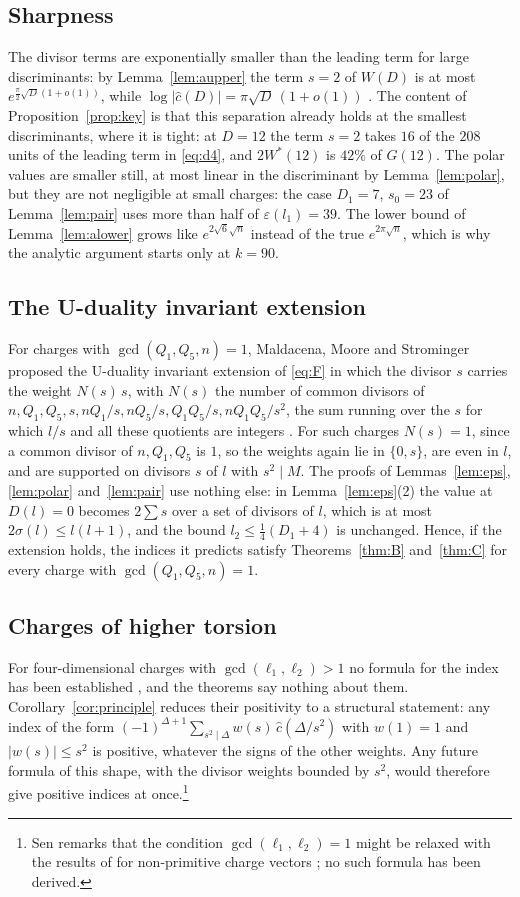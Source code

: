 \documentclass[11pt]{amsart}
\theoremstyle{definition}
\newcommand{\cc}{\hat c}
\newcommand{\Kzero}{90}
\begin{document}
\subsection{Sharpness}
The divisor terms are exponentially smaller than the leading term for large discriminants: by Lemma~\ref{lem:aupper} the term $s=2$ of $W(D)$ is at most $e^{\frac\pi2\sqrt{D}(1+o(1))}$, while $\log|\cc(D)|=\pi\sqrt D\,(1+o(1))$ \cite[(2.7)]{Sen10}. The content of Proposition~\ref{prop:key} is that this separation already holds at the smallest discriminants, where it is tight: at $D=12$ the term $s=2$ takes $16$ of the $208$ units of the leading term in \eqref{eq:d4}, and $2W^*(12)$ is $42\%$ of $G(12)$. The polar values are smaller still, at most linear in the discriminant by Lemma~\ref{lem:polar}, but they are not negligible at small charges: the case $D_1=7$, $s_0=23$ of Lemma~\ref{lem:pair} uses more than half of $\varepsilon(l_1)=39$. The lower bound of Lemma~\ref{lem:alower} grows like $e^{2\sqrt6\sqrt n}$ instead of the true $e^{2\pi\sqrt n}$, which is why the analytic argument starts only at $k=\Kzero$.

\subsection{The U-duality invariant extension}
For charges with $\gcd(Q_1,Q_5,n)=1$, Maldacena, Moore and Strominger proposed the U-duality invariant extension of \eqref{eq:F} in which the divisor $s$ carries the weight $N(s)\,s$, with $N(s)$ the number of common divisors of $n,Q_1,Q_5,s,nQ_1/s,nQ_5/s,Q_1Q_5/s,nQ_1Q_5/s^2$, the sum running over the $s$ for which $l/s$ and all these quotients are integers \cite[(6.2)--(6.3)]{MMS99}. For such charges $N(s)=1$, since a common divisor of $n,Q_1,Q_5$ is $1$, so the weights again lie in $\{0,s\}$, are even in $l$, and are supported on divisors $s$ of $l$ with $s^2\mid M$. The proofs of Lemmas~\ref{lem:eps}, \ref{lem:polar} and~\ref{lem:pair} use nothing else: in Lemma~\ref{lem:eps}(2) the value at $D(l)=0$ becomes $2\sum s$ over a set of divisors of $l$, which is at most $2\sigma(l)\le l(l+1)$, and the bound $l_2\le\frac14(D_1+4)$ is unchanged. Hence, if the extension holds, the indices it predicts satisfy Theorems~\ref{thm:B} and~\ref{thm:C} for every charge with $\gcd(Q_1,Q_5,n)=1$.

\subsection{Charges of higher torsion}\label{ssec:torsion}
For four-dimensional charges with $\gcd(\ell_1,\ell_2)>1$ no formula for the index has been established \cite[\S2]{Sen10}, and the theorems say nothing about them. Corollary~\ref{cor:principle} reduces their positivity to a structural statement: any index of the form $(-1)^{\Delta+1}\sum_{s^2\mid\Delta}w(s)\,\cc(\Delta/s^2)$ with $w(1)=1$ and $|w(s)|\le s^2$ is positive, whatever the signs of the other weights. Any future formula of this shape, with the divisor weights bounded by $s^2$, would therefore give positive indices at once.\footnote{Sen remarks that the condition $\gcd(\ell_1,\ell_2)=1$ might be relaxed with the results of \cite{SSY06} for non-primitive charge vectors \cite[\S2]{Sen10}; no such formula has been derived.}
\end{document}
